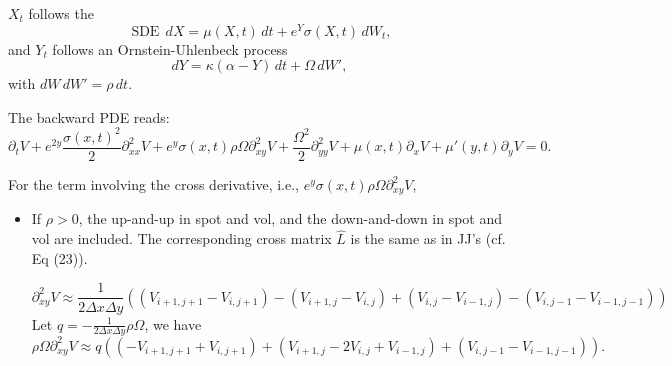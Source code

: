 \documentclass[12pt]{article}
\begin{document}
$X_t$ follows the 
\[
\operatorname{SDE} \, dX = \mu(X, t) \, dt + e^Y \sigma(X, t) \, dW_t,
\]
and $Y_t$ follows an Ornstein-Uhlenbeck process
\[
dY = \kappa(\alpha - Y) \, dt + \Omega \, dW',
\]
with $dW \, dW' = \rho \, dt$.

The backward PDE reads:
\[
\partial_t V + e^{2y} \frac{\sigma(x, t)^2}{2} \partial_{xx}^2 V + e^y \sigma(x, t) \rho \Omega \partial_{xy}^2 V + \frac{\Omega^2}{2} \partial_{yy}^2 V + \mu(x, t) \partial_x V + \mu'(y, t) \partial_y V = 0.
\]

For the term involving the cross derivative, i.e., $\boxed{e^y \sigma(x, t) \rho \Omega \partial_{xy}^2 V}$,
\begin{itemize}
    \item If $\rho > 0$, the up-and-up in spot and vol, and the down-and-down in spot and vol are included. The corresponding cross matrix $\hat{L}$ is the same as in JJ's (cf. Eq (23)).
    \begin{center}
    \end{center}    
    \begin{equation}
        \partial^2_{xy} V \approx \frac{1}{2 \Delta x \Delta y} \left( (V_{i+1, j+1} - V_{i, j+1}) - (V_{i+1, j} - V_{i, j}) + (V_{i, j} - V_{i-1, j}) - (V_{i, j-1} - V_{i-1, j-1}) \right)
    \end{equation}
    Let $q = -\frac{1}{2 \Delta x \Delta y} \rho \Omega$, we have
    \begin{equation}
        \rho \Omega \partial^2_{xy} V \approx q \left( (-V_{i+1, j+1} + V_{i, j+1}) + (V_{i+1, j} - 2V_{i, j} + V_{i-1, j}) + (V_{i, j-1} - V_{i-1, j-1}) \right).
    \end{equation}
    

\end{itemize}
\end{document}
